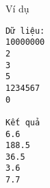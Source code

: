 Ví dụ
\begin{verbatim}
Dữ liệu:
10000000
2
3
5
1234567
0

Kết quả
6.6
188.5
36.5
3.6
7.7
\end{verbatim}